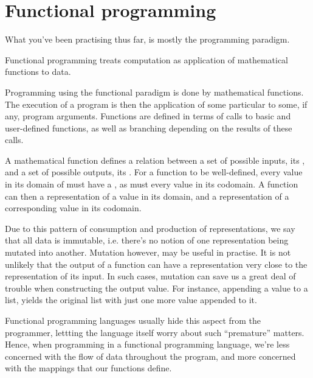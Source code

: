 \section{Functional programming}

What you've been practising thus far, is mostly the 
programming paradigm.

\begin{definition}

Functional programming treats computation as application of mathematical
functions to  data.

\end{definition}

Programming using the functional paradigm is done by 
mathematical functions. The execution of a program is then the application of
some particular  to some, if any, program arguments.
Functions are defined in terms of calls to basic and user-defined functions, as
well as branching depending on the results of these calls.

A mathematical function defines a relation between a set of possible inputs,
its , and a set of possible outputs, its . For a
function to be well-defined, every value in its domain of must have a
, as must every value in its codomain\footnotemark.
A function can then  a representation of a value in its domain,
and  a representation of a corresponding value in its codomain.


Due to this pattern of consumption and production of representations, we say
that all data is immutable, i.e. there's no notion of one representation being
mutated into another. Mutation however, may be useful in practise. It is not
unlikely that the output of a function can have a representation very close to
the representation of its input. In such cases, mutation can save us a great
deal of trouble when constructing the output value. For instance, appending a
value to a list, yields the original list with just one more value appended to
it.

Functional programming languages usually hide this aspect from the programmer,
lettting the language itself worry about such ``premature'' matters. Hence,
when programming in a functional programming language, we're less concerned
with the flow of data throughout the program, and more concerned with the
mappings that our functions define.
